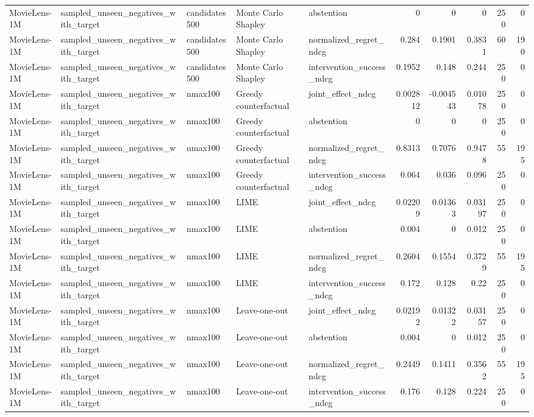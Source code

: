 \begin{table}[t]
{\begin{tabular}{lllllrrrrr}
MovieLens-1M & sampled\_unseen\_negatives\_with\_target & candidates500 & Monte Carlo Shapley & abstention & 0 & 0 & 0 & 250 & 0 \\
MovieLens-1M & sampled\_unseen\_negatives\_with\_target & candidates500 & Monte Carlo Shapley & normalized\_regret\_ndcg & 0.284 & 0.1901 & 0.3831 & 60 & 190 \\
MovieLens-1M & sampled\_unseen\_negatives\_with\_target & candidates500 & Monte Carlo Shapley & intervention\_success\_ndcg & 0.1952 & 0.148 & 0.244 & 250 & 0 \\
MovieLens-1M & sampled\_unseen\_negatives\_with\_target & nmax100 & Greedy counterfactual & joint\_effect\_ndcg & 0.002812 & -0.004543 & 0.01078 & 250 & 0 \\
MovieLens-1M & sampled\_unseen\_negatives\_with\_target & nmax100 & Greedy counterfactual & abstention & 0 & 0 & 0 & 250 & 0 \\
MovieLens-1M & sampled\_unseen\_negatives\_with\_target & nmax100 & Greedy counterfactual & normalized\_regret\_ndcg & 0.8313 & 0.7076 & 0.9478 & 55 & 195 \\
MovieLens-1M & sampled\_unseen\_negatives\_with\_target & nmax100 & Greedy counterfactual & intervention\_success\_ndcg & 0.064 & 0.036 & 0.096 & 250 & 0 \\
MovieLens-1M & sampled\_unseen\_negatives\_with\_target & nmax100 & LIME & joint\_effect\_ndcg & 0.02209 & 0.01363 & 0.03197 & 250 & 0 \\
MovieLens-1M & sampled\_unseen\_negatives\_with\_target & nmax100 & LIME & abstention & 0.004 & 0 & 0.012 & 250 & 0 \\
MovieLens-1M & sampled\_unseen\_negatives\_with\_target & nmax100 & LIME & normalized\_regret\_ndcg & 0.2604 & 0.1554 & 0.3729 & 55 & 195 \\
MovieLens-1M & sampled\_unseen\_negatives\_with\_target & nmax100 & LIME & intervention\_success\_ndcg & 0.172 & 0.128 & 0.22 & 250 & 0 \\
MovieLens-1M & sampled\_unseen\_negatives\_with\_target & nmax100 & Leave-one-out & joint\_effect\_ndcg & 0.02192 & 0.01322 & 0.03157 & 250 & 0 \\
MovieLens-1M & sampled\_unseen\_negatives\_with\_target & nmax100 & Leave-one-out & abstention & 0.004 & 0 & 0.012 & 250 & 0 \\
MovieLens-1M & sampled\_unseen\_negatives\_with\_target & nmax100 & Leave-one-out & normalized\_regret\_ndcg & 0.2449 & 0.1411 & 0.3562 & 55 & 195 \\
MovieLens-1M & sampled\_unseen\_negatives\_with\_target & nmax100 & Leave-one-out & intervention\_success\_ndcg & 0.176 & 0.128 & 0.224 & 250 & 0 \\

\end{tabular}}
\end{table}
